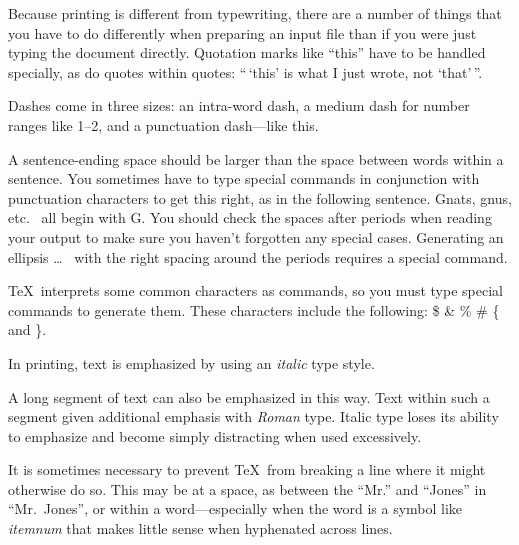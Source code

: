 Because printing is different from typewriting, there are a 
number of things that you have to do differently when preparing 
an input file than if you were just typing the document directly.  
Quotation marks like 
       ``this'' 
have to be handled specially, as do quotes within quotes: 
       ``\,`this'                  %
        is what I just 
        wrote, not  `that'\,''.  
 
Dashes come in three sizes: an 
       intra-word 
dash, a medium dash for number ranges like 
       1--2, 
and a punctuation 
       dash---like 
this.
 
A sentence-ending space should be larger than the space between words
within a sentence.  You sometimes have to type special commands in
conjunction with punctuation characters to get this right, as in the
following sentence.
       Gnats, gnus, etc.\    %
       all begin with G\@.   %
You should check the spaces after periods when reading your output to
make sure you haven't forgotten any special cases.
Generating an ellipsis 
       \ldots\    %
with the right spacing around the periods 
requires a special  command.  
 
\TeX\ interprets some common characters as commands, so you must type
special commands to generate them.  These characters include the
following: 
       \$ \& \% \# \{ and \}.
 
In printing, text is emphasized by using an
       {\em italic\/}  %
type style.  
 
\begin{em}
   A long segment of text can also be emphasized in this way.  Text within
   such a segment given additional emphasis 
          with\/ {\em Roman} 
   type.  Italic type loses its ability to emphasize and become simply
   distracting when used excessively.  
\end{em}
 
It is sometimes necessary to prevent \TeX\ from breaking a line where
it might otherwise do so.  This may be at a space, as between the
``Mr.'' and ``Jones'' in
       ``Mr.~Jones'',        %
or within a word---especially when the word is a symbol like
       \mbox{\em itemnum\/} 
that makes little sense when hyphenated across 
       lines.
 
